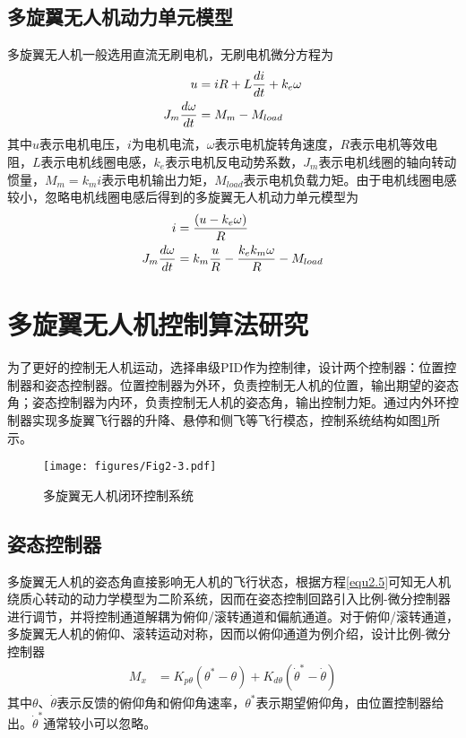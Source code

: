 \subsection{多旋翼无人机动力单元模型}
多旋翼无人机一般选用直流无刷电机，无刷电机微分方程为
\begin{equation}
\label{equ2.10}
\begin{aligned}
u &= iR + L {di \over dt} + k_e \omega
\\
J_m {d\omega \over dt} &= M_m - M_{load}
\end{aligned}
\end{equation}
其中$u$表示电机电压，$i$为电机电流，$\omega$表示电机旋转角速度，$R$表示电机等效电阻，$L$表示电机线圈电感，$k_e$表示电机反电动势系数，$J_m$表示电机线圈的轴向转动惯量，$M_m=k_m i$表示电机输出力矩，$M_{load}$表示电机负载力矩。由于电机线圈电感较小，忽略电机线圈电感后得到的多旋翼无人机动力单元模型为
\begin{equation}
\label{equ2.11}
\begin{aligned}
i &= {(u-k_e \omega) \over R }
\\
J_m {d \omega \over dt} &= k_m{u \over R } - {k_e k_m \omega \over R} - M_{load}
\end{aligned}
\end{equation}

\section{多旋翼无人机控制算法研究}
为了更好的控制无人机运动，选择串级PID作为控制律，设计两个控制器：位置控制器和姿态控制器\upcite{[2.5]}。位置控制器为外环，负责控制无人机的位置，输出期望的姿态角；姿态控制器为内环，负责控制无人机的姿态角，输出控制力矩。通过内外环控制器实现多旋翼飞行器的升降、悬停和侧飞等飞行模态，控制系统结构如图\ref{fig2.3}所示。
\begin{figure}[h]
\centering
\texttt{[image: figures/Fig2-3.pdf]}
\caption{多旋翼无人机闭环控制系统}
\label{fig2.3}
\end{figure}

\subsection{姿态控制器}
多旋翼无人机的姿态角直接影响无人机的飞行状态，根据方程\eqref{equ2.5}可知无人机绕质心转动的动力学模型为二阶系统，因而在姿态控制回路引入比例-微分控制器进行调节，并将控制通道解耦为俯仰/滚转通道和偏航通道。对于俯仰/滚转通道，多旋翼无人机的俯仰、滚转运动对称，因而以俯仰通道为例介绍，设计比例-微分控制器
\begin{equation}
\label{equ2.12}
\begin{aligned}
M_x &= K_{p\theta} \left( \theta^* - \theta \right) + K_{d\theta} \left( \dot{\theta}^* -  \dot{\theta} \right)
\end{aligned}
\end{equation}
其中$\theta$、$\dot{\theta}$表示反馈的俯仰角和俯仰角速率，$\theta^*$表示期望俯仰角，由位置控制器给出。$ \dot{\theta}^*$通常较小可以忽略。

